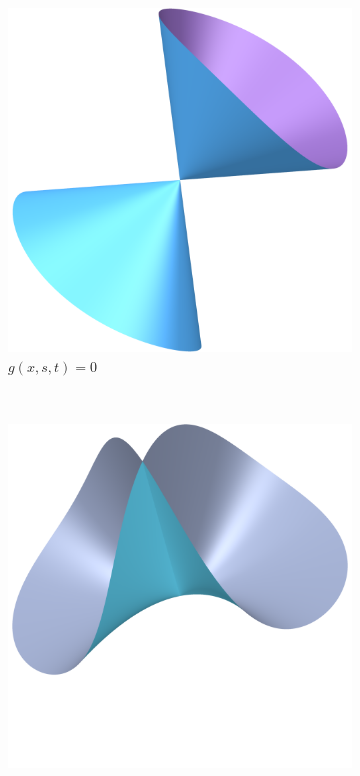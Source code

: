 \documentclass{article}
\begin{document}
\begin{example}
        \begin{figure}[h]
            \centering
            \begin{subfigure}[t]{0.2\textwidth}
                \includegraphics[width=\textwidth]{pictures/blowup_line_2.png}
                \caption{$g(x, s, t) = 0$}
            \end{subfigure}      
            ~
            \begin{subfigure}[t]{0.2\textwidth}
                \includegraphics[width=\textwidth]{pictures/blowup_line_1.png}

\end{subfigure}
\end{figure}
\end{example}
\end{document}
